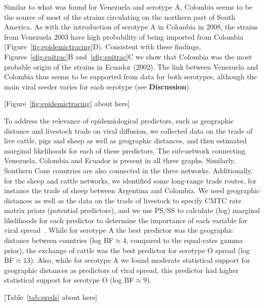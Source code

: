 \documentclass[10pt]{article}
\begin{document}
Similar to what was found for Venezuela and serotype A, Colombia seems to be the source of most of the strains circulating on the northern part of South America.
As with the introduction of serotype A in Colombia in $2008$, the strains from Venezuela $2003$ have high probability of being imported from Colombia (Figure~\ref{fig:epidemictracing}D).
Consistent with these findings, Figures~\ref{sfig:epitrac}B and~\ref{sfig:epitrac}C we show that Colombia was the most probable origin of the strains in Ecuador ($2002$).
The link between Venezuela and Colombia thus seems to be supported from data for both serotypes, although the main viral seeder varies for each serotype (see \textbf{Discussion}).

\begin{center}
 [Figure~\ref{fig:epidemictracing} about here]
\end{center}

To address the relevance of epidemiological predictors, such as geographic distance and livestock trade on viral diffusion, we collected data on the trade of live cattle, pigs and sheep  as well as geographic distances, and then estimated marginal likelihoods for each of these predictors.
The sub-network connecting Venezuela, Colombia and Ecuador is present in all three graphs.
Similarly, Southern Cone countries are also connected in the three networks.
Additionally, for the sheep and cattle networks, we identified some long-range trade routes, for instance the trade of sheep between Argentina and Colombia.
We used geographic distances as well as the data on the trade of livestock to specify CMTC rate matrix priors (potential predictors), and we use PS/SS to calculate (log) marginal likelihoods for each predictor to determine the importance of each variable for viral spread~\cite{Carvalho2013, Nelson2011}.
While for serotype A the best predictor was the geographic distance between countries (log BF$\approx 4$, compared to the equal-rates gamma prior), the exchange of cattle was the best predictor for serotype O spread (log BF$\approx 13$). 
Also, while for serotype A we found moderate statistical support for geographic distances as predictors of viral spread, this predictor had higher statistical support for serotype O (log BF$\approx 9$).

\begin{center}
 [Table~\ref{tab:preds} about here]
\end{center}
\end{document}
